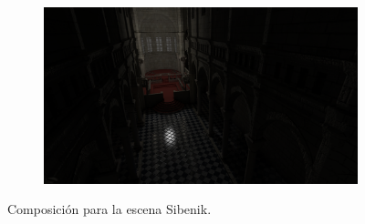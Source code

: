 \begin{figure}[H]
\begin{subfigure}[t]{.49\linewidth}
	\end{subfigure}%
	\hspace{0.01\textwidth}
	\begin{subfigure}[t]{.49\linewidth}
		\centering
		\captionsetup{justification=centering}
		\includegraphics[width=\linewidth]{media/finals/sibenik_gi.png}
	\end{subfigure}%
	\caption{Composición para la escena Sibenik.}
	\label{fig:sibenik_final}
\end{figure}
